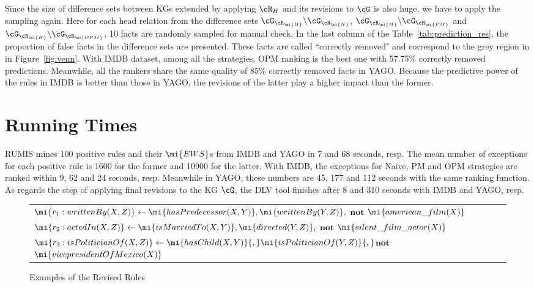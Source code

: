 Since the size of difference sets between KGs extended by applying $\cR_H$ and its revisions to $\cG$ is also huge, we have to apply the sampling again. Here for each head relation from the difference sets $\cG_{\cR_\mi{H}}\backslash \cG_{\cR_{\mi{N}}}$, $\cG_{\cR_\mi{H}}\backslash \cG_{\cR_{\mi{PM}}}$ and $\cG_{\cR_\mi{H}}\backslash \cG_{\cR_{\mi{OPM}}}$, 10 facts are randomly sampled for manual check. In the last column of the Table~\ref{tab:prediction_res}, the proportion of false facts in the difference sets are presented. These facts are called ``correctly removed" and correspond to the grey region in in Figure~\ref{fig:venn}. With IMDB dataset, among all the strategies, OPM ranking is the best one with 57.75\% correctly removed predictions. Meanwhile, all the rankers share the same quality of 85\% correctly removed facts in YAGO. Because the predictive power of the rules in IMDB is better than those in YAGO, the revisions of the latter play a higher impact than the former.

\section{Running Times}

RUMIS mines 100 positive rules and their $\mi{EWS}$s from IMDB and YAGO in 7 and 68 seconds, resp. The mean number of exceptions for each positive rule is 1600 for the former and 10900 for the latter. With IMDB, the exceptions for Naive, PM and OPM strategies are ranked within 9, 62 and 24 seconds, resp. Meanwhile in YAGO, these numbers are 45, 177 and 112 seconds with the same ranking function. As regards the step of applying final revisions to the KG $\cG$, the DLV tool finishes after 8 and 310 seconds with IMDB and YAGO, resp.

\begin{figure}[t]
    \centering
   
    \vspace{-.2cm}
    \begin{tabular}{l}
 {\scriptsize
        $\mi{r_1: writtenBy(X, Z)}  \leftarrow
        \mi{hasPredecessor(X, Y)},\mi{writtenBy(Y, Z)},$ $ \textbf{not}$  $\mi{american\_film(X)} $}\\        
       {\scriptsize 
$\mi{r_2:  actedIn(X, Z)}  \leftarrow
        \mi{isMarriedTo(X, Y)},\mi{directed(Y, Z)},$ $ \textbf{not}$  $\mi{silent\_film\_actor(X)} $} \\
          {\scriptsize 
$\mi{r_3:  isPoliticianOf(X, Z)}  \leftarrow
        \mi{hasChild(X, Y)}{,}\mi{isPoliticianOf(Y, Z)}{,}$$ \textbf{not}$  $\mi{vicepresidentOfMexico(X)} $} \\
 \end{tabular}            
    \caption{Examples of the Revised Rules}
 \label{fig:examplerules}
 \vspace{-.4cm}
\end{figure}

